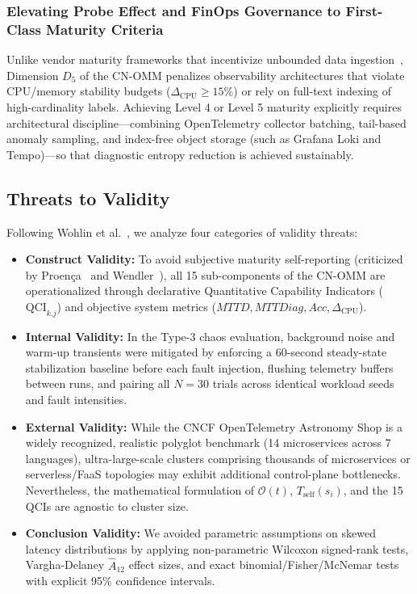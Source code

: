 \subsubsection{Elevating Probe Effect and FinOps Governance to First-Class Maturity Criteria}
Unlike vendor maturity frameworks that incentivize unbounded data ingestion~\cite{grafana_omm_2024, dynatrace_omm_2024}, Dimension $D_5$ of the CN-OMM penalizes observability architectures that violate CPU/memory stability budgets ($\Delta_{\text{CPU}} \ge 15\%$) or rely on full-text indexing of high-cardinality labels. Achieving Level 4 or Level 5 maturity explicitly requires architectural discipline---combining OpenTelemetry collector batching, tail-based anomaly sampling, and index-free object storage (such as Grafana Loki and Tempo)---so that diagnostic entropy reduction is achieved sustainably.

\subsection{Threats to Validity}
\label{subsec:threats}

Following Wohlin et al.~\cite{wohlin_2012}, we analyze four categories of validity threats:
\begin{itemize}[leftmargin=*, nosep]
    \item \textbf{Construct Validity:} To avoid subjective maturity self-reporting (criticized by Proen\c{c}a~\cite{proenca_2016_rcis} and Wendler~\cite{wendler_2012}), all 15 sub-components of the CN-OMM are operationalized through declarative Quantitative Capability Indicators ($\text{QCI}_{k.j}$) and objective system metrics ($MTTD, MTTDiag, Acc, \Delta_{\text{CPU}}$).
    \item \textbf{Internal Validity:} In the Type-3 chaos evaluation, background noise and warm-up transients were mitigated by enforcing a 60-second steady-state stabilization baseline before each fault injection, flushing telemetry buffers between runs, and pairing all $N=30$ trials across identical workload seeds and fault intensities.
    \item \textbf{External Validity:} While the CNCF OpenTelemetry Astronomy Shop is a widely recognized, realistic polyglot benchmark (14 microservices across 7 languages), ultra-large-scale clusters comprising thousands of microservices or serverless/FaaS topologies may exhibit additional control-plane bottlenecks. Nevertheless, the mathematical formulation of $\mathcal{O}(t)$, $T_{\text{self}}(s_i)$, and the 15 QCIs are agnostic to cluster size.
    \item \textbf{Conclusion Validity:} We avoided parametric assumptions on skewed latency distributions by applying non-parametric Wilcoxon signed-rank tests, Vargha-Delaney $\hat{A}_{12}$ effect sizes, and exact binomial/Fisher/McNemar tests with explicit 95\% confidence intervals.
\end{itemize}
